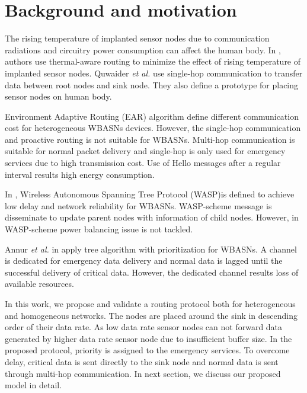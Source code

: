 \documentclass[journal]{IEEEtran}
\begin{document}
\section{Background and motivation}
The rising temperature of implanted sensor nodes due to communication radiations and circuitry power consumption can affect the human body. In \cite{3}, authors use thermal-aware routing to minimize the effect of rising temperature of implanted sensor nodes. Quwaider \textit{et al.} \cite{4} use single-hop communication to transfer data between root nodes and sink node. They also define a prototype for placing sensor nodes on human body.

Environment Adaptive Routing (EAR) algorithm \cite{5} define different communication cost for heterogeneous WBASNs devices. However, the single-hop communication and proactive routing is not suitable for WBASNs. Multi-hop communication is suitable for normal packet delivery and single-hop is only used for emergency services due to high transmission cost. Use of Hello messages after a regular interval results high energy consumption.

In \cite{6}, Wireless Autonomous Spanning Tree Protocol (WASP)is defined to achieve low delay and network reliability for WBASNs. WASP-scheme message is disseminate to update parent nodes with information of child nodes. However, in WASP-scheme power balancing issue is not tackled.

Annur \textit{et al.} in \cite{7} apply tree algorithm with prioritization for WBASNs. A channel is dedicated for emergency data delivery and normal data is lagged until the successful delivery of critical data. However, the dedicated channel results loss of available resources.

In this work, we propose and validate a routing protocol both for heterogeneous and homogeneous networks. The nodes are placed around the sink in descending order of their data rate. As low data rate sensor nodes can not forward data generated by higher data rate sensor node due to insufficient buffer size. In the proposed protocol, priority is assigned to the emergency services. To overcome delay, critical data is sent directly to the sink node and normal data is sent through multi-hop communication. In next section, we discuss our proposed model in detail.
\end{document}
